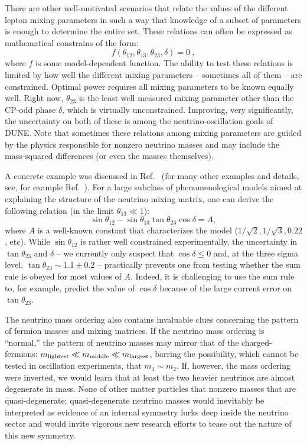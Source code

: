There are other well-motivated scenarios that relate the values of the different lepton mixing parameters in such a way that knowledge of a subset of parameters is enough to determine the entire set. These relations can often be expressed as mathematical constrains of the form:
\begin{equation}
f(\theta_{12},\theta_{13}, \theta_{23}, \delta)=0~,
\end{equation}
where $f$ is some model-dependent function. The ability to test these relations is limited by how well the different mixing parameters -- sometimes all of them -- are constrained. Optimal power requires all mixing parameters to be known equally well. Right now, $\theta_{23}$ is the least well measured mixing parameter other than the CP-odd phase $\delta$, which is virtually unconstrained. Improving, very significantly, the uncertainty on both of these is among the neutrino-oscillation goals of DUNE. Note that sometimes these relations among mixing parameters are guided by the physics responsible for nonzero neutrino masses and may include the mass-squared differences (or even the masses themselves).

A concrete example was discussed in Ref.~\cite{Antusch:2007rk} (for many other examples and details, see, for example Ref.~\cite{Ballett:2013wya}). For a large subclass of phenomenological models aimed at explaining the structure of the neutrino mixing matrix, one can derive the following relation (in the limit $\theta_{13}\ll 1$):
$$
\sin\theta_{12}-\sin\theta_{13}\tan\theta_{23}\cos\delta = A,
$$
where $A$ is a well-known constant that characterizes the model ($1/\sqrt{2}, 1/\sqrt{3}, 0.22$, etc). While $\sin\theta_{12}$ is rather well constrained experimentally, the uncertainty in $\tan\theta_{23}$ and $\delta$ -- we currently only suspect that $\cos\delta\le0$ and, at the three sigma level, $\tan\theta_{23}\sim 1.1\pm0.2$ --  practically prevents one from testing whether the sum rule is obeyed for most values of $A$. Indeed, it is challenging to use the sum rule to, for example, predict the value of $\cos\delta$ because of the large current error on $\tan\theta_{23}$. 

The neutrino mass ordering also contains invaluable clues concerning the pattern of fermion masses and mixing matrices. If the neutrino mass ordering is ``normal,'' the pattern of neutrino masses may mirror that of the charged-fermions: $m_{\rm lightest}\ll m_{\rm middle}\ll m_{\rm largest}$, barring the possibility, which cannot be tested in oscillation experiments, that $m_1\sim m_2$. If, however, the mass ordering were inverted, we would learn that at least the two heavier neutrinos are almost degenerate in mass. None of other matter particles that nonzero masses that are quasi-degenerate; quasi-degenerate neutrino masses would inevitably be interpreted as evidence of an internal symmetry lurks deep inside the neutrino sector and would invite vigorous new research efforts to tease out the nature of this new symmetry. 

